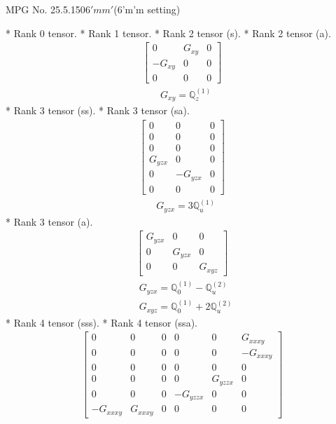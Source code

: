 \documentclass[fleqn,8pt,landscape]{jsarticle}
\begin{document}
\setcounter{MaxMatrixCols}{32}

\renewcommand{\tablename}{Table~}
\renewcommand{\figurename}{Figure~}
\begin{center}
\LARGE
MPG No. 25.5.150\quad$6'mm'$\quad(6'm'm setting)
\end{center}
* Rank 0 tensor.
* Rank 1 tensor.
* Rank 2 tensor (s).
* Rank 2 tensor (a).
\begin{align*}
\begin{bmatrix} 0 & G_{xy} & 0 \\ - G_{xy} & 0 & 0 \\ 0 & 0 & 0 \end{bmatrix}
\end{align*}
\begin{align*}
& G_{xy} = \mathbb{Q}_{z}^{(1)}
\end{align*}
* Rank 3 tensor (ss).
* Rank 3 tensor (sa).
\begin{align*}
\begin{bmatrix} 0 & 0 & 0 \\ 0 & 0 & 0 \\ 0 & 0 & 0 \\ G_{yzx} & 0 & 0 \\ 0 & - G_{yzx} & 0 \\ 0 & 0 & 0 \end{bmatrix}
\end{align*}
\begin{align*}
& G_{yzx} = 3 \mathbb{Q}_{u}^{(1)}
\end{align*}
* Rank 3 tensor (a).
\begin{align*}
\begin{bmatrix} G_{yzx} & 0 & 0 \\ 0 & G_{yzx} & 0 \\ 0 & 0 & G_{xyz} \end{bmatrix}
\end{align*}
\begin{align*}
& G_{yzx} = \mathbb{Q}_{0}^{(1)} - \mathbb{Q}_{u}^{(2)} \\
& G_{xyz} = \mathbb{Q}_{0}^{(1)} + 2 \mathbb{Q}_{u}^{(2)}
\end{align*}
* Rank 4 tensor (sss).
* Rank 4 tensor (ssa).
\begin{align*}
\begin{bmatrix} 0 & 0 & 0 & 0 & 0 & G_{xxxy} \\ 0 & 0 & 0 & 0 & 0 & - G_{xxxy} \\ 0 & 0 & 0 & 0 & 0 & 0 \\ 0 & 0 & 0 & 0 & G_{yzzx} & 0 \\ 0 & 0 & 0 & - G_{yzzx} & 0 & 0 \\ - G_{xxxy} & G_{xxxy} & 0 & 0 & 0 & 0 \end{bmatrix}
\end{align*}
\end{document}
